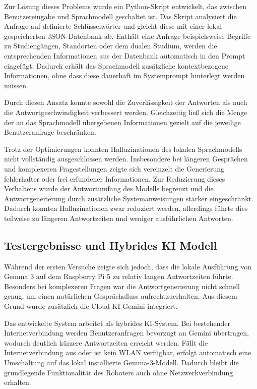 Zur Lösung dieses Problems wurde ein Python-Skript entwickelt, das zwischen Benutzereingabe und Sprachmodell geschaltet ist. Das Skript analysiert die Anfrage auf definierte Schlüsselwörter und gleicht diese mit einer lokal gespeicherten JSON-Datenbank ab. Enthält eine Anfrage beispielsweise Begriffe zu Studiengängen, Standorten oder dem dualen Studium, werden die entsprechenden Informationen aus der Datenbank automatisch in den Prompt eingefügt. Dadurch erhält das Sprachmodell zusätzliche kontextbezogene Informationen, ohne dass diese dauerhaft im Systemprompt hinterlegt werden müssen.

Durch diesen Ansatz konnte sowohl die Zuverlässigkeit der Antworten als auch die Antwortgeschwindigkeit verbessert werden. Gleichzeitig ließ sich die Menge der an das Sprachmodell übergebenen Informationen gezielt auf die jeweilige Benutzeranfrage beschränken.

Trotz der Optimierungen konnten Halluzinationen des lokalen Sprachmodells nicht vollständig ausgeschlossen werden. Insbesondere bei längeren Gesprächen und komplexeren Fragestellungen zeigte sich vereinzelt die Generierung fehlerhafter oder frei erfundener Informationen. Zur Reduzierung dieses Verhaltens wurde der Antwortumfang des Modells begrenzt und die Antwortgenerierung durch zusätzliche Systemanweisungen stärker eingeschränkt. Dadurch konnten Halluzinationen zwar reduziert werden, allerdings führte dies teilweise zu längeren Antwortzeiten und weniger ausführlichen Antworten. 
 
\subsection{Testergebnisse und Hybrides KI Modell}

Während der ersten Versuche zeigte sich jedoch, dass die lokale Ausführung von Gemma 3 auf dem Raspberry Pi 5 zu relativ langen Antwortzeiten führte. Besonders bei komplexeren Fragen war die Antwortgenerierung nicht schnell genug, um einen natürlichen Gesprächsfluss aufrechtzuerhalten. Aus diesem Grund wurde zusätzlich die Cloud-KI Gemini integriert.

Das entwickelte System arbeitet als hybrides KI-System. Bei bestehender Internetverbindung werden Benutzeranfragen bevorzugt an Gemini übertragen, wodurch deutlich kürzere Antwortzeiten erreicht werden. Fällt die Internetverbindung aus oder ist kein WLAN verfügbar, erfolgt automatisch eine Umschaltung auf das lokal installierte Gemma-3-Modell. Dadurch bleibt die grundlegende Funktionalität des Roboters auch ohne Netzwerkverbindung erhalten.

